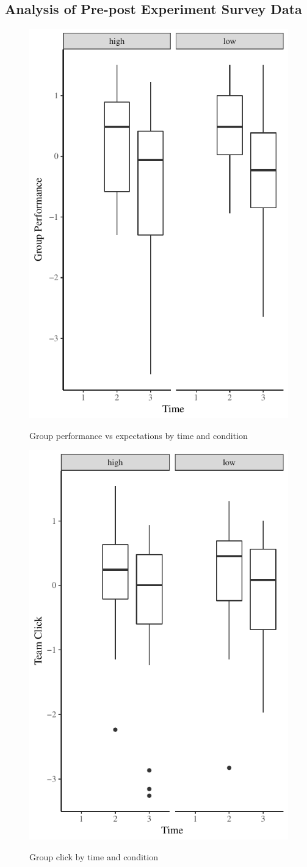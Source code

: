 \subsection{Analysis of Pre-post Experiment Survey Data}







\begin{figure}
  \centering
    \includegraphics[width=0.5\linewidth,keepaspectratio] {images/groupPerfConfPlot}
    \label{fig:groupPerfConfPlot}
    \caption{Group performance vs expectations by time and condition}
\end{figure}


\begin{figure}
  \centering
  \includegraphics[width=0.5\linewidth,keepaspectratio] {images/prePostClickPLot}
  \label{fig:prePostClickPLot}
  \caption{Group click by time and condition}
\end{figure}

